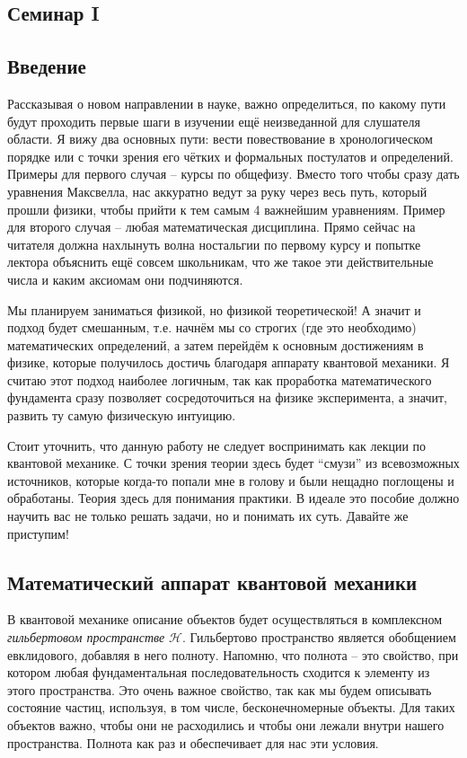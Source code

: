 \begin{center}
    \section{Семинар I}
\end{center}
\subsection{Введение}


\hspace{1em} Рассказывая о новом направлении в науке, важно определиться, по какому пути будут проходить первые шаги в изучении ещё неизведанной для слушателя области. Я вижу два основных пути: вести повествование в хронологическом порядке или с точки зрения его чётких и формальных постулатов и определений. Примеры для первого случая -- курсы по общефизу. Вместо того чтобы сразу дать уравнения Максвелла, нас аккуратно ведут за руку через весь путь, который прошли физики, чтобы прийти к тем самым 4 важнейшим уравнениям. Пример для второго случая -- любая математическая дисциплина. Прямо сейчас на читателя должна нахлынуть волна ностальгии по первому курсу и попытке лектора объяснить ещё совсем школьникам, что же такое эти действительные числа и каким аксиомам они подчиняются.

Мы планируем заниматься физикой, но физикой теоретической! А значит и подход будет смешанным, т.е. начнём мы со строгих (где это необходимо) математических определений, а затем перейдём к основным достижениям в физике, которые получилось достичь благодаря аппарату квантовой механики. Я считаю этот подход наиболее логичным, так как проработка математического фундамента сразу позволяет сосредоточиться на физике эксперимента, а значит, развить ту самую физическую интуицию.

Стоит уточнить, что данную работу не следует воспринимать как лекции по квантовой механике. С точки зрения теории здесь будет ``смузи'' из всевозможных источников, которые когда-то попали мне в голову и были нещадно поглощены и обработаны. Теория здесь для понимания практики. В идеале это пособие должно научить вас не только решать задачи, но и понимать их суть. Давайте же приступим!

\subsection{Математический аппарат квантовой механики}
\hspace{1em} В квантовой механике описание объектов будет осуществляться в комплексном \textit{гильбертовом пространстве} $\mathcal{H}$. Гильбертово пространство является обобщением евклидового, добавляя в него полноту. Напомню, что полнота -- это свойство, при котором любая фундаментальная последовательность сходится к элементу из этого пространства. Это очень важное свойство, так как мы будем описывать состояние частиц, используя, в том числе, бесконечномерные объекты. Для таких объектов важно, чтобы они не расходились и чтобы они лежали внутри нашего пространства. Полнота как раз и обеспечивает для нас эти условия. 

